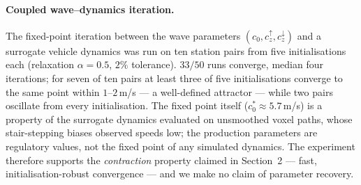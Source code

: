 \paragraph{Coupled wave--dynamics iteration.}
The fixed-point iteration between the wave parameters
$(c_0, c_z^{\uparrow}, c_z^{\downarrow})$ and a surrogate vehicle
dynamics was run on ten station pairs from five initialisations each
(relaxation $\alpha = 0.5$, $2\%$ tolerance). $33/50$ runs converge,
median four iterations; for seven of ten pairs at least three of five
initialisations converge to the same point within $1$--$2\,$m/s ---
a well-defined attractor --- while two pairs oscillate from every
initialisation. The fixed point itself ($c_0^\ast \approx 5.7\,$m/s)
is a property of the surrogate dynamics evaluated on unsmoothed voxel
paths, whose stair-stepping biases observed speeds low; the
production parameters are regulatory values, not the fixed point of
any simulated dynamics. The experiment therefore supports the
\emph{contraction} property claimed in Section~2 --- fast,
initialisation-robust convergence --- and we make no claim of
parameter recovery.

